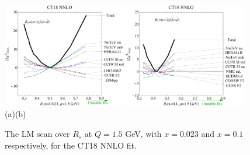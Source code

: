 \begin{figure}[b]
\begin{center}
	\includegraphics[width=0.48\textwidth]{./fig/Rs_scan2Tct18_1.pdf}\quad
	\includegraphics[width=0.48\textwidth]{./fig/Rs_scan2Tct18_2.pdf}\\
(a)\hspace{2.6in}(b)\\
	\caption{The LM scan over $R_s$ at $Q=1.5$ GeV, with $x=0.023$ and $x=0.1$ respectively, for the CT18 NNLO fit.
\label{fig:LMRs}}
\end{center}
\end{figure}

